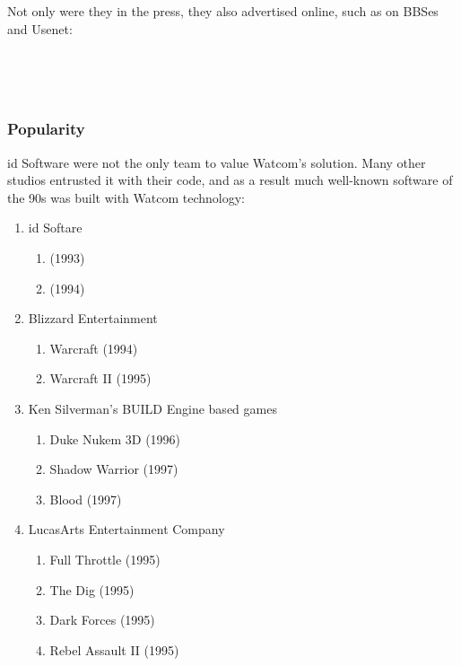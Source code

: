 \vspace{-4mm}
Not only were they in the press, they also advertised online, such as on BBSes and Usenet:\\
\par
{}\\
\par
{}\\


\subsubsection{Popularity}
id Software were not the only team to value Watcom's solution. Many other studios entrusted it with their code, and as a result much well-known software of the 90s was built with Watcom technology:\\
\begin{enumerate}
\item id Softare 
       \begin{enumerate}
       \item \doom{} (1993)
       \item \doomii{} (1994)
       \end{enumerate} 
\item Blizzard Entertainment 
       \begin{enumerate}
       \item Warcraft (1994)
       \item Warcraft II (1995)
       \end{enumerate}
\item Ken Silverman's BUILD Engine based games
      \begin{enumerate}
       \item Duke Nukem 3D (1996)
       \item Shadow Warrior (1997)
       \item Blood (1997)
       \end{enumerate}
\item LucasArts Entertainment Company
      \begin{enumerate}
       \item Full Throttle (1995)
       \item The Dig (1995)
       \item Dark Forces  (1995)
       \item Rebel Assault II  (1995)    
      \end{enumerate}
\end{enumerate}
\par



